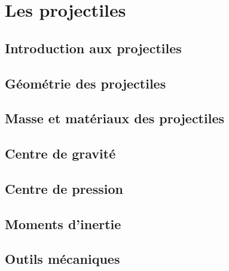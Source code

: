 \part{Les projectiles}

    \chapter{Introduction aux projectiles}
    \label{chap:introduction_aux_projectiles}
    

    \chapter{Géométrie des projectiles}
    \label{chap:geometrie_projectiles}
    

    \chapter{Masse et matériaux des projectiles}
    \label{chap:masse_et_materiaux}
    

    \chapter{Centre de gravité}
    \label{chap:centre_gravite}
    

    \chapter{Centre de pression}
    \label{chap:centre_pression}
    

    \chapter{Moments d'inertie}
    \label{chap:moments_inertie}
    

    \chapter{Outils mécaniques}
    \label{chap:outils_mecaniques}
    

